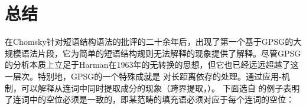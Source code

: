 \section{总结}
\label{Abschnitt-Einordnung-GPSG}\label{sec-derivation-GPSG}

在Chomsky针对短语结构语法的批评的二十余年后，出现了第一个基于GPSG的大规模语法片段，它为简单的短语结构规则无法解释的现象提供了解释。尽管GPSG的分析本质上立足于Harman在1963年的无转换的思想，但它也已经远远超越了这一层次。特别地，GPSG的一个特殊成就是 \citet{Gazdar81a}对长距离依存的处理。通过应用\slasch-机制，可以解释从连词中同时提取成分的现象（跨界提取，\citealp{Ross67a}）。
下面选自 \citet[]{Gazdar81a}的例子表明了连词中的空位必须是一致的，即某范畴的填充语必须对应于每个连词的空位：
\addlines[2]
\eal\settowidth{}
\label{ex-atb-gazdar}
\ex
[]{ 
\gll The          kennel which     Mary made and Fido sleeps in         has          been stolen.\\
     \defart{} 狗窝 \textsc{rel} Mary 做   和  Fido 睡觉 在……里 \textsc{aux} \passive{} 偷\\	 \jambox{(= S/NP \& S/NP)}
\mytrans{Mary做的那个Fido睡在里面的狗窝被偷了。}
}
